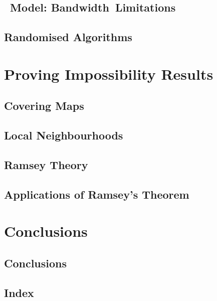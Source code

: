 \chapter{\tCONGEST{}~Model: Bandwidth~Limitations}\label{ch:congest}


\chapter{Randomised Algorithms}\label{ch:rand}


\part{Proving Impossibility Results}

\chapter{Covering Maps}\label{ch:covering-map}


\chapter{Local Neighbourhoods}\label{ch:local-neighbourhoods}


\chapter{Ramsey Theory}


\chapter{Applications of Ramsey's Theorem}


\part{Conclusions}

\chapter{Conclusions}


\backmatter

\chapter{Index}


\printendnotes[custom]

\renewcommand{\bibsection}{\chapter{\bibname}}




